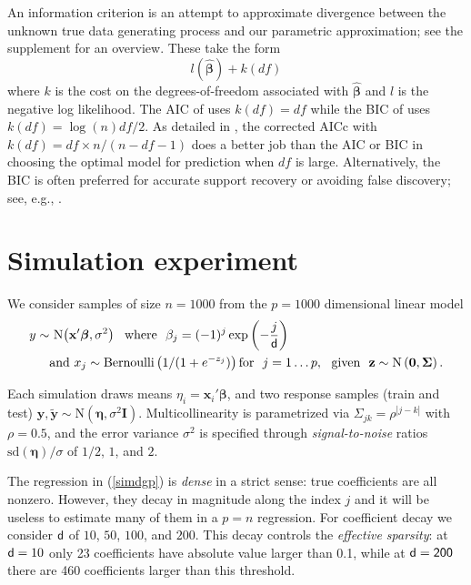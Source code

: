 \documentclass[12pt]{article}
\newcommand{\bs}[1]{\boldsymbol{#1}}
\newcommand{\mr}[1]{\mathrm{#1}}
\newcommand{\bm}[1]{\mathbf{#1}}
\begin{document}
An information criterion is an attempt to approximate
 divergence between the unknown true data generating
process and our parametric approximation; see the supplement for an
overview.  These  take the form
\begin{equation}
l(\bs{\hat\beta}) + k(df)
\end{equation}
where $k$ is the cost on the degrees-of-freedom associated with
 $\bs{\hat\beta}$ and $l$ is the negative log likelihood.  The AIC of
\cite{akaike_information_1973} uses $k(df) = df$ while the BIC of \cite{schwarz_estimating_1978}
uses $k(df) = \log(n)df/2$. As detailed in \cite{flynn_efficiency_2013}, the
corrected AICc with $k(df) = df\times n/(n-df-1)$ does a better job than the
AIC or BIC in choosing the optimal model for prediction when $df$ is large.
Alternatively, the BIC is often preferred for accurate support recovery or
avoiding false discovery; see, e.g.,
\cite{zou_degrees_2007}.


\section{Simulation experiment}
\label{sec:sim}

We consider samples of size $n=1000$ from the $p=1000$ dimensional linear model
\begin{align}
\label{simdgp}
y \sim &~ \mr{N}\!\left(\bm{x}'\bs{\beta},\sigma^2\right)~~\text{where}~~
\beta_j = (-1)^j\exp\left(-\frac{j}{{\sf d}} \right)\\
&\text{and}~x_j \sim \mr{Bernoulli}\left( 1/(1+e^{-z_j})\right) \text{for}~~j=1\dots p,~~\text{given}~~\bm{z} \sim \mr{N}\left(\bm{0},\bs{\Sigma}\right).\notag 
\end{align}

\vspace{-.4cm}
\noindent
Each simulation draws means $\eta_i =
\bm{x}_i'\bs{\beta}$, and two response samples (train and test)
$\bm{y},\bm{\tilde y} \sim \mr{N}(\bs{\eta},\sigma^2\bm{I})$. Multicollinearity is
parametrized via $\Sigma_{jk} =
\rho^{|j-k|}$ with $\rho = 0.5$, and the error variance $\sigma^2$ is specified through {\it signal-to-noise} ratios
$\mr{sd}(\bs{\eta})/\sigma$ of $1/2$, $1$, and $2$. 


The regression in (\ref{simdgp}) is {\it dense} in a strict sense:  true
coefficients are all nonzero.  However, they decay in magnitude along the
index $j$ and
it will be useless to estimate many of them in a $p=n$ regression.
For coefficient decay we consider
${\sf d}$ of $10$, $50$, $100$, and $200$.  This decay controls the {\it effective sparsity}: at ${\sf d}=10$ only 23 coefficients have absolute value larger than 0.1, while at ${\sf d=200}$ there are 460 coefficients larger than this threshold. 
\end{document}
